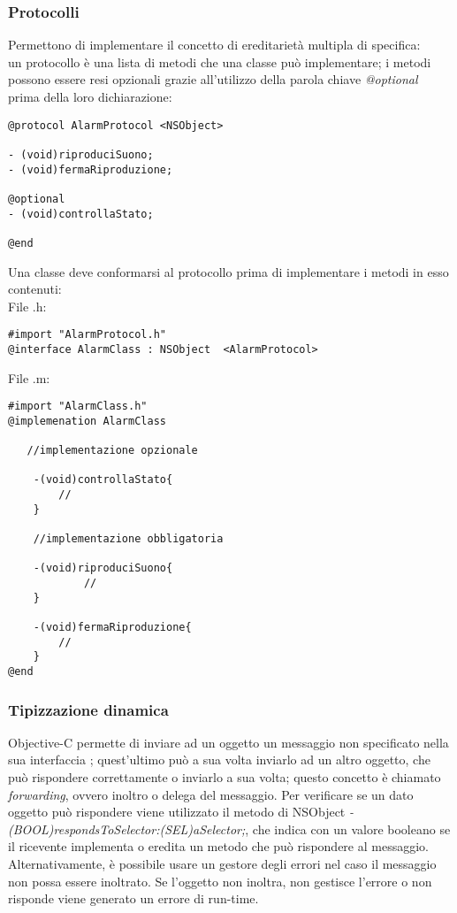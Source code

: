 \subsubsection{Protocolli}
Permettono di implementare il concetto di ereditarietà multipla di specifica:\\
un protocollo è una lista di metodi che una classe può implementare; i metodi possono essere resi opzionali grazie all'utilizzo della parola chiave \textit{@optional} prima della loro dichiarazione: 
\lstset{language=[Objective]C, breakindent=40pt, breaklines}
\begin{lstlisting}
@protocol AlarmProtocol <NSObject>

- (void)riproduciSuono;
- (void)fermaRiproduzione;

@optional
- (void)controllaStato;

@end
\end{lstlisting}
\newpage
Una classe deve conformarsi al protocollo prima di implementare i metodi in esso contenuti:\\
File .h: 
\lstset{language=[Objective]C, breakindent=40pt, breaklines}
\begin{lstlisting}
#import "AlarmProtocol.h"
@interface AlarmClass : NSObject  <AlarmProtocol>
\end{lstlisting}
File .m:
\lstset{language=[Objective]C, breakindent=40pt, breaklines}
\begin{lstlisting}
#import "AlarmClass.h"
@implemenation AlarmClass
  
   //implementazione opzionale 
    
    -(void)controllaStato{
		//
    }

    //implementazione obbligatoria  
   
    -(void)riproduciSuono{
    	    // 
    }
    
    -(void)fermaRiproduzione{
   	 	//
    }
@end
\end{lstlisting}
\subsubsection{Tipizzazione dinamica}
Objective-C permette di inviare ad un oggetto un messaggio non specificato nella sua interfaccia ; quest'ultimo può a sua volta inviarlo ad un altro oggetto, che può rispondere correttamente o inviarlo a sua volta; questo concetto è chiamato \textit{forwarding}, ovvero inoltro o delega del messaggio. Per verificare se un dato oggetto può rispondere viene utilizzato il metodo di NSObject \textit{- (BOOL)respondsToSelector:(SEL)aSelector;}, che indica con un valore booleano se il ricevente implementa o eredita un metodo che può rispondere al messaggio.\\Alternativamente, è possibile usare un gestore degli errori nel caso il messaggio non possa essere inoltrato. Se l'oggetto non inoltra, non gestisce l'errore o non risponde viene generato un errore di run-time. 
